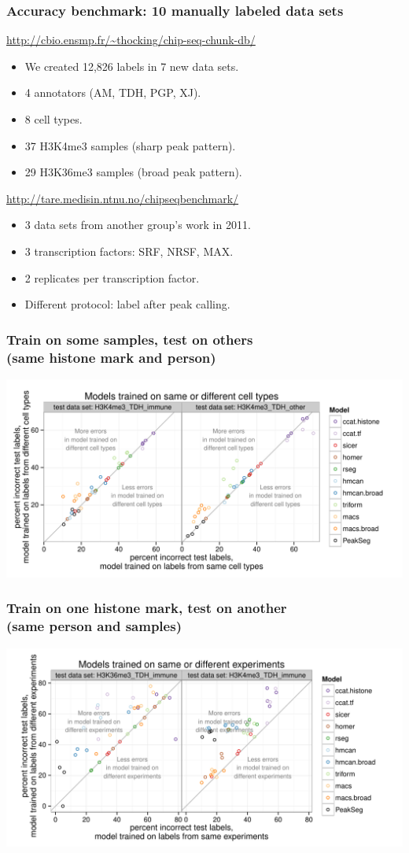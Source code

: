 \documentclass{beamer}
\begin{document}
\begin{frame}
  \frametitle{Accuracy benchmark: 10 manually labeled data sets}
  \url{http://cbio.ensmp.fr/~thocking/chip-seq-chunk-db/}
  \begin{itemize}
  \item We created 12,826 labels in 7 new data sets.
  \item 4 annotators (AM, TDH, PGP, XJ).
  \item 8 cell types.
  \item 37 H3K4me3 samples (sharp peak pattern).
  \item 29 H3K36me3 samples (broad peak pattern).
  \end{itemize}
  \vskip 1cm
  \url{http://tare.medisin.ntnu.no/chipseqbenchmark/}
  \begin{itemize}
  \item 3 data sets from another group's work in 2011.
  \item 3 transcription factors: SRF, NRSF, MAX.
  \item 2 replicates per transcription factor.
  \item Different protocol: label after peak calling.
  \end{itemize}
\end{frame}

\begin{frame}
  \frametitle{Train on some samples, test on others\\
(same histone mark and person)}
  \includegraphics[width=1.1\textwidth]{figure-test-H3K4me3-types.pdf}
\end{frame}

\begin{frame}
  \frametitle{Train on one histone mark, test on another\\
(same person and samples)}
  \includegraphics[width=1.1\textwidth]{figure-test-TDH-experiments.pdf}
\end{frame}
\end{document}
